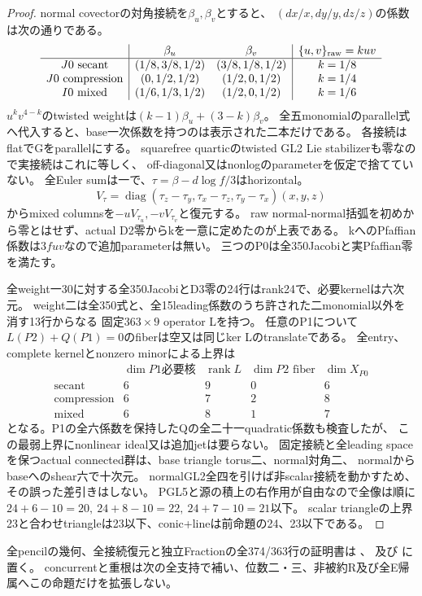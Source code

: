 \documentclass[a4paper,11pt]{ltjsarticle}
\theoremstyle{definition}
\newcommand{\rank}{\operatorname{rank}}
\begin{document}
\begin{proof}
normal covectorの対角接続を$\beta_u,\beta_v$とすると、
$(dx/x,dy/y,dz/z)$の係数は次の通りである。
\[
\begin{array}{c|cc|c}
 &\beta_u&\beta_v&\{u,v\}_{\rm raw}=kuv\\\hline
 J0\ \text{secant}&(1/8,3/8,1/2)&(3/8,1/8,1/2)&k=1/8\\
 J0\ \text{compression}&(0,1/2,1/2)&(1/2,0,1/2)&k=1/4\\
 I0\ \text{mixed}&(1/6,1/3,1/2)&(1/2,0,1/2)&k=1/6
\end{array}
\]
$u^kv^{4-k}$のtwisted weightは$(k-1)\beta_u+(3-k)\beta_v$。
全五monomialのparallel式へ代入すると、base一次係数を持つのは表示された二本だけである。
各接続はflatでGをparallelにする。
squarefree quarticのtwisted GL2 Lie stabilizerも零なので実接続はこれに等しく、
off-diagonal又はnonlogのparameterを仮定で捨てていない。
全Euler sumは一で、$\tau=\beta-d\log f/3$はhorizontal。
\[
 V_\tau=\operatorname{diag}(\tau_z-\tau_y,\tau_x-\tau_z,\tau_y-\tau_x)(x,y,z)
\]
からmixed columnsを$-uV_{\tau_u},-vV_{\tau_v}$と復元する。
raw normal-normal括弧を初めから零とはせず、actual D2零からkを一意に定めたのが上表である。
kへのPfaffian係数は$3fuv$なので追加parameterは無い。
三つのP0は全350Jacobiと実Pfaffian零を満たす。

全weight一30に対する全350JacobiとD3零の24行はrank24で、必要kernelは六次元。
weight二は全350式と、全15leading係数のうち許された二monomial以外を消す13行からなる
固定$363\times9$ operator Lを持つ。
任意のP1について$L(P2)+Q(P1)=0$のfiberは空又は同じker Lのtranslateである。
全entry、complete kernelとnonzero minorによる上界は
\[
\begin{array}{c|rrrr}
 &\dim P1\text{必要核}&\rank L&\dim P2\text{ fiber}&\dim X_{P0}\\\hline
 \text{secant}&6&9&0&6\\
 \text{compression}&6&7&2&8\\
 \text{mixed}&6&8&1&7
\end{array}
\]
となる。P1の全六係数を保持したQの全二十一quadratic係数も検査したが、
この最弱上界にnonlinear ideal又は追加jetは要らない。
固定接続と全leading spaceを保つactual connected群は、base triangle torus二、normal対角二、
normalからbaseへのshear六で十次元。
normalGL2全四を引けば非scalar接続を動かすため、その誤った差引きはしない。
PGL5と源の積上の右作用が自由なので全像は順に
$24+6-10=20,\ 24+8-10=22,\ 24+7-10=21$以下。
scalar triangleの上界23と合わせtriangleは23以下、conic+lineは前命題の24、23以下である。
\end{proof}
全pencilの幾何、全接続復元と独立Fractionの全374/363行の証明書は
、
及び
に置く。
concurrentと重根は次の全支持で補い、位数二・三、非被約R及び全E帰属へこの命題だけを拡張しない。
\end{document}
